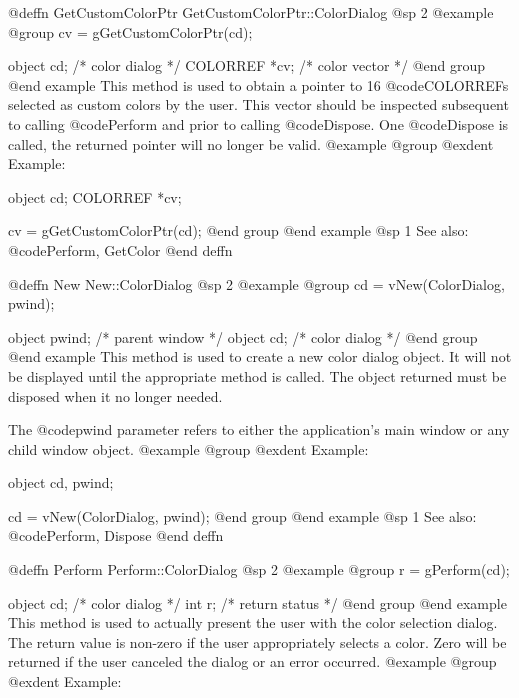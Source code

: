 @deffn {GetCustomColorPtr} GetCustomColorPtr::ColorDialog
@sp 2
@example
@group
cv = gGetCustomColorPtr(cd);

object   cd;    /*  color dialog    */
COLORREF *cv;   /*  color vector    */
@end group
@end example
This method is used to obtain a pointer to 16 @code{COLORREF}s
selected as custom colors by the user.  This vector should be
inspected subsequent to calling @code{Perform} and prior to
calling @code{Dispose}.  One @code{Dispose} is called, the returned
pointer will no longer be valid.
@example
@group
@exdent Example:

object  cd;
COLORREF *cv;

cv = gGetCustomColorPtr(cd);
@end group
@end example
@sp 1
See also:  @code{Perform, GetColor}
@end deffn




















@deffn {New} New::ColorDialog
@sp 2
@example
@group
cd = vNew(ColorDialog, pwind);

object  pwind;  /*  parent window  */
object  cd;     /*  color dialog   */
@end group
@end example
This method is used to create a new color dialog object.  It will not be
displayed until the appropriate method is called.  The object returned
must be disposed when it no longer needed.

The @code{pwind} parameter refers to either the application's main window
or any child window object.
@example
@group
@exdent Example:

object  cd, pwind;

cd = vNew(ColorDialog, pwind);
@end group
@end example
@sp 1
See also:  @code{Perform, Dispose}
@end deffn









@deffn {Perform} Perform::ColorDialog
@sp 2
@example
@group
r = gPerform(cd);

object  cd;     /*  color dialog   */
int     r;      /*  return status  */
@end group
@end example
This method is used to actually present the user with the color
selection dialog.  The return value is non-zero if the user appropriately
selects a color.  Zero will be returned if the user canceled the dialog
or an error occurred.
@example
@group
@exdent Example:

